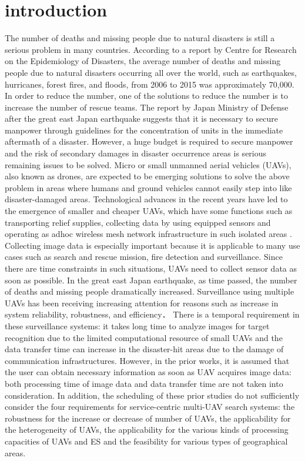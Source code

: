 \documentclass{ieeeaccess}
\begin{document}
\section{introduction}\label{intro}
The number of deaths and missing people due to natural disasters is still a serious problem in many countries.
According to a report by Centre for Research on the Epidemiology of Disasters\cite{CRED2016}, the average number of deaths and missing people due to natural disasters occurring all over the world, such as earthquakes, hurricanes, forest fires, and floods, from 2006 to 2015 was approximately 70,000.
In order to reduce the number, one of the solutions to reduce the number is to increase the number of rescue teams.
The report by Japan Ministry of Defense after the great east Japan earthquake suggests that  it is necessary to secure manpower through guidelines for the concentration of units in the immediate aftermath of a disaster.
%
However, a huge budget is required to secure manpower and the risk of secondary damages in disaster occurrence areas is serious remaining issues to be solved\cite{disaster2011}.
%
Micro or small unmanned aerial vehicles (UAVs), also known as drones, are expected to be emerging solutions to solve the above problem in areas where humans and ground vehicles cannot easily step into like disaster-damaged areas.
Technological advances in the recent years have led to the emergence of smaller and cheaper UAVs, which have some functions such as transporting relief supplies, collecting data by using equipped sensors and operating as adhoc wireless mesh network infrastructure in such isolated areas \cite{Andre2014,Erdelj2016,Felice2014}.
Collecting image data is especially important because it is applicable to many use cases such as search and rescue mission, fire detection and surveillance.
%
Since there are time constraints in such situations, UAVs need to collect sensor data as soon as possible.
In the great east Japan earthquake, as time passed, the number of deaths and missing people  dramatically increased\cite{japan2011}.
Surveillance using multiple UAVs has been receiving increasing attention for reasons such as increase in system reliability, robustness, and efficiency\cite{Lanillos2014,Maza2007,Meng2014,chang2016,Mirzaei2011}．
%
There is a temporal requirement in these surveillance systems: it takes long time to analyze images for target recognition due to the limited computational resource of small UAVs and the data transfer time can increase in the disaster-hit areas due to the damage of communication infrastructures.
%
However, in the prior works, it is assumed that the user can obtain necessary information as soon as UAV acquires image data: both processing time of image data and data transfer time are not taken into consideration. 
In addition, the scheduling of these prior studies do not sufficiently consider the four requirements for service-centric multi-UAV search systems: the robustness for the increase or decrease of number of UAVs, the applicability for the heterogeneity of UAVs, the applicability for the various kinds of processing capacities of UAVs and ES and the feasibility for various types of geographical areas.
\end{document}
